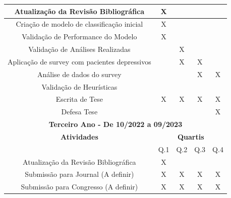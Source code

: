 \documentclass[11pt, notitlepage]{article} %
\begin{document}
\begin{table}[!ht]
\begin{tabular}{cllll}
  \multicolumn{1}{|c|}{Atualização da Revisão Bibliográfica} & \multicolumn{1}{c|}{X} & \multicolumn{1}{c|}{} & \multicolumn{1}{c|}{} & \multicolumn{1}{c|}{} \\ \hline
  \multicolumn{1}{|c|}{Criação de modelo de classificação inicial} & \multicolumn{1}{c|}{X} & \multicolumn{1}{c|}{} & \multicolumn{1}{c|}{} & \multicolumn{1}{c|}{} \\ \hline
  \multicolumn{1}{|c|}{Validação de Performance do Modelo} & \multicolumn{1}{c|}{X} & \multicolumn{1}{c|}{} & \multicolumn{1}{c|}{} & \multicolumn{1}{c|}{} \\ \hline
  \multicolumn{1}{|c|}{Validação de Análises Realizadas} & \multicolumn{1}{c|}{} & \multicolumn{1}{c|}{X} & \multicolumn{1}{c|}{} & \multicolumn{1}{c|}{} \\ \hline
  
  
  \multicolumn{1}{|c|}{Aplicação de survey com pacientes depressivos} & \multicolumn{1}{c|}{} & \multicolumn{1}{c|}{X} & \multicolumn{1}{c|}{X} & \multicolumn{1}{c|}{} \\ \hline
  \multicolumn{1}{|c|}{Análise de dados do survey} & \multicolumn{1}{c|}{} & \multicolumn{1}{c|}{} & \multicolumn{1}{c|}{X} & \multicolumn{1}{c|}{X} \\ \hline
  
  \multicolumn{1}{|c|}{Validação de Heurísticas} & \multicolumn{1}{c|}{} & \multicolumn{1}{c|}{} & \multicolumn{1}{c|}{} & \multicolumn{1}{c|}{} \\ \hline
  \multicolumn{1}{|c|}{Escrita de Tese} & \multicolumn{1}{c|}{X} & \multicolumn{1}{c|}{X} & \multicolumn{1}{c|}{X} & \multicolumn{1}{c|}{X} \\ \hline
  \multicolumn{1}{|c|}{Defesa Tese} & \multicolumn{1}{c|}{} & \multicolumn{1}{c|}{} & \multicolumn{1}{c|}{} & \multicolumn{1}{c|}{X} \\ \hline
  \multicolumn{5}{|c|}{\cellcolor[HTML]{C0C0C0}\textbf{\large{Terceiro Ano - De 10/2022 a 09/2023}}} \\ \hline
  \multicolumn{1}{|c|}{\cellcolor[HTML]{C0C0C0}\textbf{Atividades}} & \multicolumn{4}{c|}{\cellcolor[HTML]{C0C0C0}\textbf{Quartis}} \\ \hline
  \multicolumn{1}{|c|}{} & \multicolumn{1}{c|}{Q.1} & \multicolumn{1}{c|}{Q.2} & \multicolumn{1}{c|}{Q.3} & \multicolumn{1}{c|}{Q.4} \\ \hline

  \multicolumn{1}{|c|}{Atualização da Revisão Bibliográfica} & \multicolumn{1}{c|}{X} & \multicolumn{1}{c|}{} & \multicolumn{1}{c|}{} & \multicolumn{1}{c|}{} \\ \hline
  \multicolumn{1}{|c|}{Submissão para Journal (A definir)} & \multicolumn{1}{c|}{X} & \multicolumn{1}{c|}{X} & \multicolumn{1}{c|}{X} & \multicolumn{1}{c|}{X} \\ \hline
  \multicolumn{1}{|c|}{Submissão para Congresso (A definir)} & \multicolumn{1}{c|}{X} & \multicolumn{1}{c|}{X} & \multicolumn{1}{c|}{X} & \multicolumn{1}{c|}{X} \\ \hline
  


\end{tabular}
\end{table}
\end{document}

